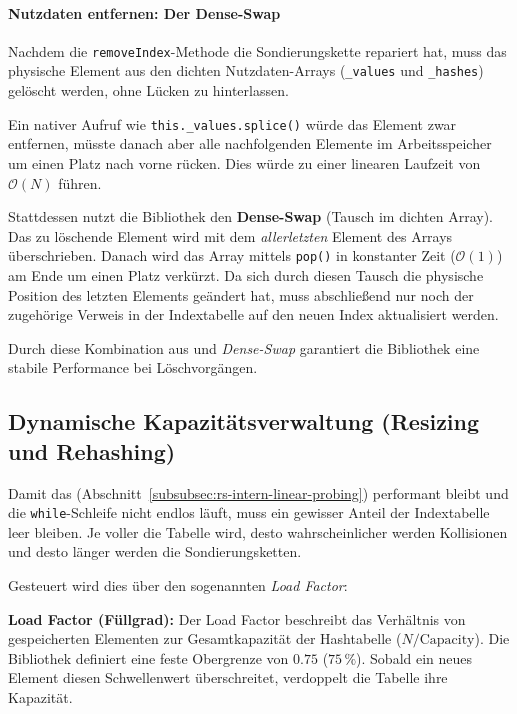 \paragraph*{Nutzdaten entfernen: Der Dense-Swap}
Nachdem die \texttt{removeIndex}-Methode die Sondierungskette repariert hat, muss das physische Element aus den dichten Nutzdaten-Arrays (\texttt{_values} und \texttt{_hashes}) gelöscht werden, ohne Lücken zu hinterlassen.

Ein nativer Aufruf wie \texttt{this._values.splice()} würde das Element zwar entfernen, müsste danach aber alle nachfolgenden Elemente im Arbeitsspeicher um einen Platz nach vorne rücken. Dies würde zu einer linearen Laufzeit von $\mathcal{O}(N)$ führen.

Stattdessen nutzt die Bibliothek den \textbf{Dense-Swap} (Tausch im dichten Array). Das zu löschende Element wird mit dem \textit{allerletzten} Element des Arrays überschrieben. Danach wird das Array mittels \texttt{pop()} in konstanter Zeit ($\mathcal{O}(1)$) am Ende um einen Platz verkürzt. Da sich durch diesen Tausch die physische Position des letzten Elements geändert hat, muss abschließend nur noch der zugehörige Verweis in der Indextabelle auf den neuen Index aktualisiert werden. 

Durch diese Kombination aus \textit{} und \textit{Dense-Swap} garantiert die Bibliothek eine stabile Performance bei Löschvorgängen.


\subsection{Dynamische Kapazitätsverwaltung (Resizing und Rehashing)}
\label{subsec:rs-intern-resize-shrink}

Damit das \textit{} (Abschnitt~\ref{subsubsec:rs-intern-linear-probing}) performant bleibt und die \texttt{while}-Schleife nicht endlos läuft, muss ein gewisser Anteil der Indextabelle leer bleiben. Je voller die Tabelle wird, desto wahrscheinlicher werden Kollisionen und desto länger werden die Sondierungsketten.

Gesteuert wird dies über den sogenannten \textit{Load Factor}:

\begin{definition}
\label{def:load-factor}
\textbf{Load Factor (Füllgrad):} Der Load Factor beschreibt das Verhältnis von gespeicherten Elementen zur Gesamtkapazität der Hashtabelle ($N / \text{Capacity}$). Die Bibliothek definiert eine feste Obergrenze von $0.75$ ($75\,\%$). Sobald ein neues Element diesen Schwellenwert überschreitet, verdoppelt die Tabelle ihre Kapazität. 
\end{definition}


